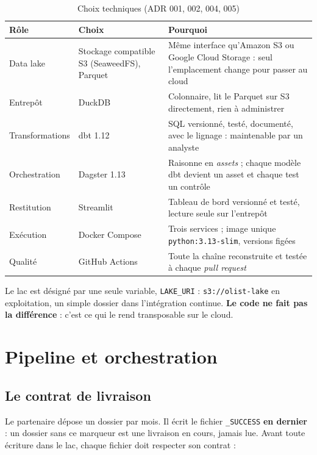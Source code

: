 \documentclass[11pt, a4paper, oneside, headings=normal, numbers=noenddot, DIV=12]{scrartcl}
\begin{document}
\begin{table}[H]
\centering\small
\begin{tabularx}{\linewidth}{@{}L{2.6cm} L{3.6cm} Y@{}}
\toprule
\textbf{Rôle} & \textbf{Choix} & \textbf{Pourquoi} \\
\midrule
Data lake & Stockage compatible S3 (SeaweedFS), Parquet & Même interface qu'Amazon S3 ou Google Cloud Storage : seul l'emplacement change pour passer au cloud \\
Entrepôt & DuckDB & Colonnaire, lit le Parquet sur S3 directement, rien à administrer \\
Transformations & dbt 1.12 & SQL versionné, testé, documenté, avec le lignage : maintenable par un analyste \\
Orchestration & Dagster 1.13 & Raisonne en \emph{assets} ; chaque modèle dbt devient un asset et chaque test un contrôle \\
Restitution & Streamlit & Tableau de bord versionné et testé, lecture seule sur l'entrepôt \\
Exécution & Docker Compose & Trois services ; image unique \texttt{python:3.13-slim}, versions figées \\
Qualité & GitHub Actions & Toute la chaîne reconstruite et testée à chaque \emph{pull request} \\
\bottomrule
\end{tabularx}
\caption{Choix techniques (ADR 001, 002, 004, 005)}
\end{table}

Le lac est désigné par une seule variable, \texttt{LAKE\_URI} : \texttt{s3://olist-lake} en exploitation, un simple dossier dans
l'intégration continue. \textbf{Le code ne fait pas la différence} : c'est ce qui le rend transposable sur le cloud.

\section{Pipeline et orchestration}

\subsection{Le contrat de livraison}
Le partenaire dépose un dossier par mois. Il écrit le fichier \texttt{\_SUCCESS} \textbf{en dernier} : un dossier sans ce marqueur est
une livraison en cours, jamais lue. Avant toute écriture dans le lac, chaque fichier doit respecter son contrat :
\end{document}
